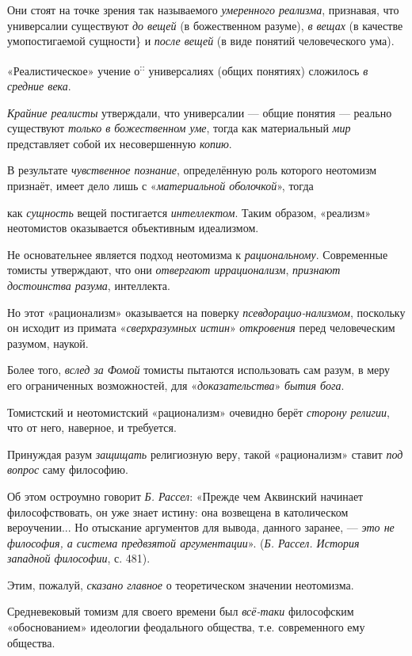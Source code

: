 \documentclass[a4paper,14pt,russian]{extreport}
\begin{document}
Они стоят на точке зрения так называемого \emph{умеренного реализма}, признавая, что универсалии существуют \emph{до вещей} (в божественном разуме), \emph{в вещах} (в качестве умопостигаемой сущности\} и \emph{после вещей} (в виде понятий человеческого ума).

«Реалистическое» учение о\textsuperscript{::} универсалиях (общих понятиях) сложилось \emph{в средние века}.

\emph{Крайние реалисты} утверждали, что универсалии --- общие понятия --- реально существуют \emph{только в божественном уме}, тогда как материальный \emph{мир} представляет собой их несовершенную \emph{копию}.

В результате \emph{чувственное познание}, определённую роль которого неотомизм признаёт, имеет дело лишь с «\emph{материальной оболочкой}», тогда

как \emph{сущность} вещей постигается \emph{интеллектом}. Таким образом, «реализм» неотомистов оказывается объективным идеализмом.

Не основательнее является подход неотомизма к \emph{рациональному}. Современные томисты утверждают, что они \emph{отвергают иррационализм}, \emph{признают достоинства разума}, интеллекта.

Но этот «рационализм» оказывается на поверку \emph{псевдорацио-нализмом}, поскольку он исходит из примата «\emph{сверхразумных истин}» \emph{откровения} перед человеческим разумом, наукой.

Более того, \emph{вслед за Фомой} томисты пытаются использовать сам разум, в меру его ограниченных возможностей, для «\emph{доказательства}» \emph{бытия бога}.

Томистский и неотомистский «рационализм» очевидно берёт \emph{сторону религии}, что от него, наверное, и требуется.

Принуждая разум \emph{защищать} религиозную веру, такой «рационализм» ставит \emph{под вопрос} саму философию.

Об этом остроумно говорит \emph{Б. Рассел}: «Прежде чем Аквинский начинает философствовать, он уже знает истину: она возвещена в католическом вероучении... Но отыскание аргументов для вывода, данного заранее, --- \emph{это не философия, а система предвзятой аргументации}». (\emph{Б. Рассел. История западной философии}, с. 481).

Этим, пожалуй, \emph{сказано главное} о теоретическом значении неотомизма.

Средневековый томизм для своего времени был \emph{всё-таки} философским «обоснованием» идеологии феодального общества, т.е. современного ему общества.
\end{document}
